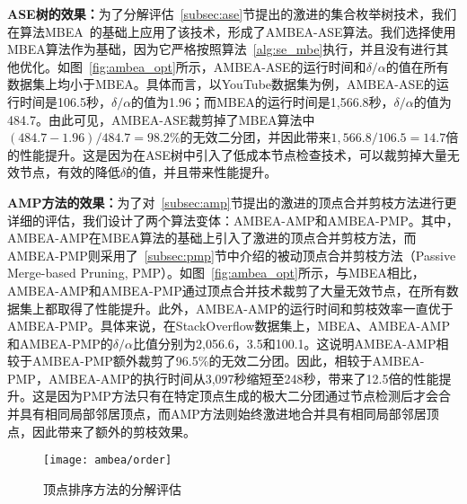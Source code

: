 

\textbf{ASE树的效果：}为了分解评估~\ref{subsec:ase}节提出的激进的集合枚举树技术，我们在算法MBEA~\cite{iMBEA14}的基础上应用了该技术，形成了AMBEA-ASE算法。我们选择使用MBEA算法作为基础，因为它严格按照算法~\ref{alg:se_mbe}执行，并且没有进行其他优化。如图~\ref{fig:ambea_opt}所示，AMBEA-ASE的运行时间和$\delta/\alpha$的值在所有数据集上均小于MBEA。具体而言，以YouTube数据集为例，AMBEA-ASE的运行时间是106.5秒，$\delta/\alpha$的值为1.96；而MBEA的运行时间是1,566.8秒，$\delta/\alpha$的值为484.7。由此可见，AMBEA-ASE裁剪掉了MBEA算法中$(484.7-1.96)/484.7=98.2\%$的无效二分团，并因此带来$1,566.8/106.5=14.7$倍的性能提升。这是因为在ASE树中引入了低成本节点检查技术，可以裁剪掉大量无效节点，有效的降低$\delta$的值，并且带来性能提升。

\textbf{AMP方法的效果：}为了对~\ref{subsec:amp}节提出的激进的顶点合并剪枝方法进行更详细的评估，我们设计了两个算法变体：AMBEA-AMP和AMBEA-PMP。其中，AMBEA-AMP在MBEA算法的基础上引入了激进的顶点合并剪枝方法，而AMBEA-PMP则采用了~\ref{subsec:pmp}节中介绍的被动顶点合并剪枝方法（Passive Merge-based Pruning, PMP）。如图~\ref{fig:ambea_opt}所示，与MBEA相比，AMBEA-AMP和AMBEA-PMP通过顶点合并技术裁剪了大量无效节点，在所有数据集上都取得了性能提升。此外，AMBEA-AMP的运行时间和剪枝效率一直优于AMBEA-PMP。具体来说，在StackOverflow数据集上，MBEA、AMBEA-AMP和AMBEA-PMP的$\delta/\alpha$比值分别为2,056.6，3.5和100.1。这说明AMBEA-AMP相较于AMBEA-PMP额外裁剪了96.5\%的无效二分团。因此，相较于AMBEA-PMP，AMBEA-AMP的执行时间从3,097秒缩短至248秒，带来了12.5倍的性能提升。这是因为PMP方法只有在特定顶点生成的极大二分团通过节点检测后才会合并具有相同局部邻居顶点，而AMP方法则始终激进地合并具有相同局部邻居顶点，因此带来了额外的剪枝效果。

\begin{figure} [H]
	\centering

		\texttt{[image: ambea/order]}


	\caption{顶点排序方法的分解评估}
	\label{fig:ambea_opt_order}
\end{figure}


